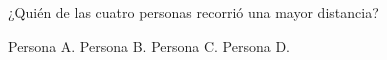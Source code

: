 ¿Quién de las cuatro personas recorrió una mayor distancia?

\begin{choices}
    \CorrectChoice  Persona A.
    \choice         Persona B.
    \choice         Persona C.
    \choice         Persona D.
\end{choices}
